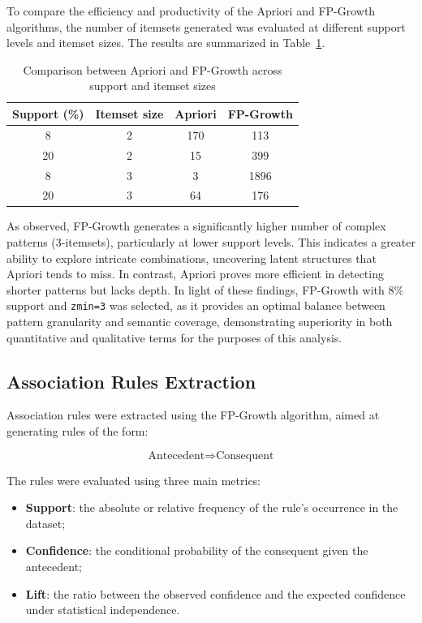 \documentclass[10pt]{article}
\begin{document}
To compare the efficiency and productivity of the Apriori and FP-Growth algorithms, the number of itemsets generated was evaluated at different support levels and itemset sizes. The results are summarized in Table~\ref{tab:algo_comparison}.

\begin{table}[H]
\centering
\caption{Comparison between Apriori and FP-Growth across support and itemset sizes}
\label{tab:algo_comparison}
\begin{tabular}{|c|c|c|c|}
\hline
\textbf{Support (\%)} & \textbf{Itemset size} & \textbf{Apriori} & \textbf{FP-Growth} \\
\hline
8 & 2 & 170 & 113 \\
20 & 2 & 15 & 399 \\
8 & 3 & 3 & 1896 \\
20 & 3 & 64 & 176 \\
\hline
\end{tabular}
\end{table}

As observed, FP-Growth generates a significantly higher number of complex patterns (3-itemsets), particularly at lower support levels. This indicates a greater ability to explore intricate combinations, uncovering latent structures that Apriori tends to miss. In contrast, Apriori proves more efficient in detecting shorter patterns but lacks depth.
In light of these findings, FP-Growth with 8\% support and \texttt{zmin=3} was selected, as it provides an optimal balance between pattern granularity and semantic coverage, demonstrating superiority in both quantitative and qualitative terms for the purposes of this analysis.


\subsection{Association Rules Extraction}
Association rules were extracted using the FP-Growth algorithm, aimed at generating rules of the form:

\[
\text{Antecedent} \Rightarrow \text{Consequent}
\]

The rules were evaluated using three main metrics:
\begin{itemize}
  \item \textbf{Support}: the absolute or relative frequency of the rule's occurrence in the dataset;
  \item \textbf{Confidence}: the conditional probability of the consequent given the antecedent;
  \item \textbf{Lift}: the ratio between the observed confidence and the expected confidence under statistical independence.
\end{itemize}
\end{document}

